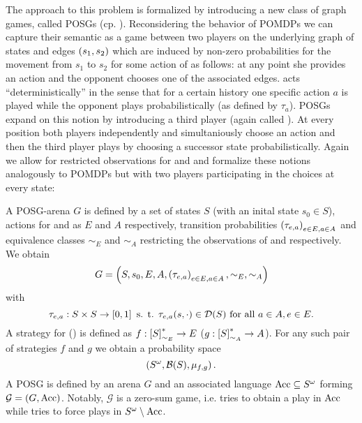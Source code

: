 The approach to this problem is formalized by introducing a new class of graph
games, called \acp{POSG} (cp. \cite{POSG, PureStratPOSG}). Reconsidering the 
behavior of \acp{POMDP} we can capture their semantic as a game between two 
players on the underlying graph of states and edges $\left(s_{1}, s_{2}\right)$ 
which are induced by non-zero probabilities for the movement from $s_{1}$ to 
$s_{2}$ for some action of \eve{} as follows: at any point she provides an 
action and the opponent chooses one of the associated edges. \eve{}
acts \enquote{deterministically} in the sense that for a certain history 
one specific action $a$ is played while the opponent plays probabilistically 
(as defined by $\tau_{a}$). \acp{POSG} expand on this notion by introducing a 
third player (again called \adam{}). At every position both players 
independently and simultaniously choose an action and then the third player 
plays by choosing a successor state probabilistically. Again we allow for 
restricted observations for \eve{} and \adam{} and formalize these notions 
analogously to \acp{POMDP} but with two players 
participating in the choices at every state:
\begin{definition}
  A \ac{POSG}-arena $G$ is defined by a set of states $S$ (with an 
  inital state $s_{0}\in S$), actions for \eve{} and \adam{} as $E$ and $A$ 
  respectively, transition probabilities $\left(\tau_{e,a}\right)_{e\in E, a\in A}$ 
  and equivalence classes $\sim_{E}$ and $\sim_{A}$ restricting the 
  observations of \eve{} and \adam{} respectively. We obtain
  \begin{equation*}
    G = \left(S, s_{0}, E, A, \left(\tau_{e,a}\right)_{e\in E, a\in A}, 
    \sim_{E}, \sim_{A}\right)
  \end{equation*}
  with
  \begin{equation*}
    \tau_{e,a}:S\times S\rightarrow\left[0,1\right] \text{ s. t. }
    \tau_{e,a}(s, \cdot)\in\mathcal{D}(S)\text{ for all }a\in A, e\in E.
  \end{equation*}
  A strategy for \eve{} (\adam{}) is defined as 
  $f:\left[S\right]_{\sim_{E}}^{*}\rightarrow E$ 
  ($g:\left[S\right]_{\sim_{A}}^{*}\rightarrow A$). For any such pair of 
  strategies $f$ and $g$ we obtain a probability space
  \begin{equation*}
    \left(S^{\omega}, \mathcal{B}(S), \mu_{f, g}\right).
  \end{equation*}
  A \ac{POSG} is defined by an arena $G$ and an associated language
  $\operatorname{Acc}\subseteq S^{\omega}$ forming $\mathcal{G} = \left(G, \operatorname{Acc}\right)$. Notably,
  $\mathcal{G}$ is a zero-sum game, i.e. \eve{} tries to obtain a play in 
  $\operatorname{Acc}$ while \adam{} tries to force plays in $S^{\omega}\setminus\operatorname{Acc}$.
\end{definition}
